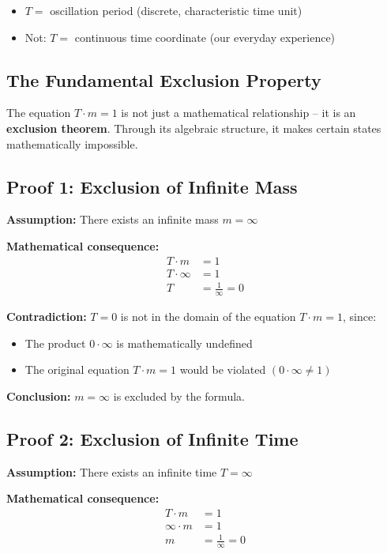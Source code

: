 	\begin{itemize}
		\item $T =$ oscillation period (discrete, characteristic time unit)
		\item Not: $T =$ continuous time coordinate (our everyday experience)
	\end{itemize}
	
	\subsection{The Fundamental Exclusion Property}
	
	The equation $T \cdot m = 1$ is not just a mathematical relationship -- it is an \textbf{exclusion theorem}. Through its algebraic structure, it makes certain states mathematically impossible.
	
	\subsection{Proof 1: Exclusion of Infinite Mass}
	
	\textbf{Assumption:} There exists an infinite mass $m = \infty$
	
	\textbf{Mathematical consequence:}
	\begin{align}
		T \cdot m &= 1\\
		T \cdot \infty &= 1\\
		T &= \frac{1}{\infty} = 0
	\end{align}
	
	\textbf{Contradiction:} $T = 0$ is not in the domain of the equation $T \cdot m = 1$, since:
	\begin{itemize}
		\item The product $0 \cdot \infty$ is mathematically undefined
		\item The original equation $T \cdot m = 1$ would be violated $(0 \cdot \infty \neq 1)$
	\end{itemize}
	
	\textbf{Conclusion:} $m = \infty$ is excluded by the formula.
	
	\subsection{Proof 2: Exclusion of Infinite Time}
	
	\textbf{Assumption:} There exists an infinite time $T = \infty$
	
	\textbf{Mathematical consequence:}
	\begin{align}
		T \cdot m &= 1\\
		\infty \cdot m &= 1\\
		m &= \frac{1}{\infty} = 0
	\end{align}
	
